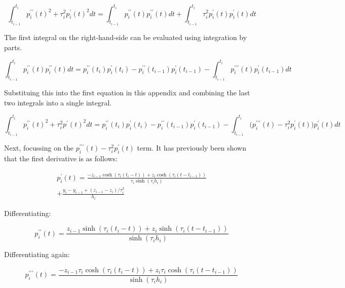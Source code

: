\documentclass{article}
\begin{document}
\begin{equation}
    \int_{t_{i - 1}}^{t_i}p^{\prime\prime}_i(t)^2 + \tau_i^2 p^{\prime}_i(t)^2 dt
    = \int_{t_{i - 1}}^{t_i}p^{\prime\prime}_i(t) p^{\prime\prime}_i(t) dt +
    \int_{t_{i - 1}}^{t_i} \tau_i^2 p^{\prime}_i(t) p^{\prime}_i(t) dt
\end{equation}

The first integral on the right-hand-side can be evaluated using integration by parts.

\begin{equation}
    \int_{t_{i - 1}}^{t_i}p^{\prime\prime}_i(t) p^{\prime\prime}_i(t) dt = 
    p^{\prime\prime}_i(t_i) p^{\prime}_i(t_i) - p^{\prime\prime}_i(t_{i - 1}) p^{\prime}_i(t_{i - 1})
    - \int_{t_{i - 1}}^{t_i} p^{\prime\prime\prime}_i(t) p^{\prime}_i(t_{i - 1}) dt
\end{equation}

Substituing this into the first equation in this appendix and combining the last two integrals
into a single integral.

\begin{equation}
    \int_{t_{i - 1}}^{t_i}p^{\prime\prime}_i(t)^2 + \tau_i^2 p^{\prime}(t)^2 dt
    = p^{\prime\prime}_i(t_i) p^{\prime}_i(t_i) - p^{\prime\prime}_i(t_{i - 1}) p^{\prime}_i(t_{i - 1})
    - \int_{t_{i - 1}}^{t_i} \bigl( p^{\prime\prime\prime}_i(t) - \tau_i^2 p^{\prime}_i(t) \bigr) p^{\prime}_i(t) dt
\end{equation}

Next, focussing on the $p^{\prime\prime\prime}_i(t) - \tau_i^2 p^{\prime}_i(t)$ term. It has previously been
shown that the first derivative is as follows:

\begin{multline}
    p^\prime_i(t) = \frac{ -z_{i-1} \cosh(\tau_i (t_i - t)) + z_i \cosh(\tau_i (t - t_{i-1}))}{\tau_i \sinh(\tau_i h_i)}  \\
        + \frac{y_i - y_{i-1} +  (z_{i-1} - z_i)/\tau_i^2}{h_i}
\end{multline}

Differentiating:

\begin{equation}
    p^{\prime\prime}_i(t) = \frac{ z_{i-1} \sinh(\tau_i (t_i - t)) + z_i \sinh(\tau_i (t - t_{i-1}))}{\sinh(\tau_i h_i)}
\end{equation}

Differentiating again:

\begin{equation}
    p^{\prime\prime\prime}_i(t) = \frac{ -z_{i-1} \tau_i \cosh(\tau_i (t_i - t)) + z_i \tau_i \cosh(\tau_i (t - t_{i-1}))}{\sinh(\tau_i h_i)}
\end{equation}
\end{document}
